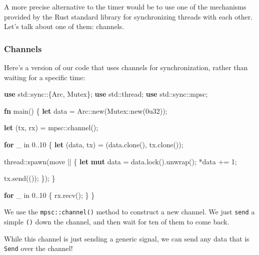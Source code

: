 \documentclass[a4paper,]{book}
\newenvironment{Shaded}{\begin{snugshade}}{\end{snugshade}}
\newcommand{\KeywordTok}[1]{\textcolor[rgb]{0.13,0.29,0.53}{\textbf{{#1}}}}
\newcommand{\DecValTok}[1]{\textcolor[rgb]{0.00,0.00,0.81}{{#1}}}
\newcommand{\NormalTok}[1]{{#1}}
\begin{document}
A more precise alternative to the timer would be to use one of the
mechanisms provided by the Rust standard library for synchronizing
threads with each other. Let's talk about one of them: channels.

\subsubsection{Channels}\label{channels}

Here's a version of our code that uses channels for synchronization,
rather than waiting for a specific time:

\begin{Shaded}
\begin{Highlighting}[]
\KeywordTok{use} \NormalTok{std::sync::\{Arc, Mutex\};}
\KeywordTok{use} \NormalTok{std::thread;}
\KeywordTok{use} \NormalTok{std::sync::mpsc;}

\KeywordTok{fn} \NormalTok{main() \{}
    \KeywordTok{let} \NormalTok{data = Arc::new(Mutex::new(}\DecValTok{0u32}\NormalTok{));}

    \KeywordTok{let} \NormalTok{(tx, rx) = mpsc::channel();}

    \KeywordTok{for} \NormalTok{_ in }\DecValTok{0.}\NormalTok{.}\DecValTok{10} \NormalTok{\{}
        \KeywordTok{let} \NormalTok{(data, tx) = (data.clone(), tx.clone());}

        \NormalTok{thread::spawn(move || \{}
            \KeywordTok{let} \KeywordTok{mut} \NormalTok{data = data.lock().unwrap();}
            \NormalTok{*data += }\DecValTok{1}\NormalTok{;}

            \NormalTok{tx.send(());}
        \NormalTok{\});}
    \NormalTok{\}}

    \KeywordTok{for} \NormalTok{_ in }\DecValTok{0.}\NormalTok{.}\DecValTok{10} \NormalTok{\{}
        \NormalTok{rx.recv();}
    \NormalTok{\}}
\NormalTok{\}}
\end{Highlighting}
\end{Shaded}

We use the \texttt{mpsc::channel()} method to construct a new channel.
We just \texttt{send} a simple \texttt{()} down the channel, and then
wait for ten of them to come back.

While this channel is just sending a generic signal, we can send any
data that is \texttt{Send} over the channel!
\end{document}
